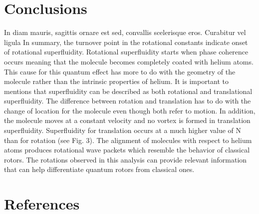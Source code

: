 \documentclass[a0b,landscape]{a0poster}
\begin{document}
\begin{multicols}{3}
\section*{Conclusions}
In diam mauris, sagittis ornare est sed, convallis scelerisque eros. Curabitur vel ligula In summary, the turnover point in the rotational constants indicate onset of rotational superfluidity.  Rotational superfluidity starts when phase coherence occurs meaning that the molecule becomes completely coated with helium atoms. This cause for this quantum effect has more to do with the geometry of the molecule rather than the intrinsic properties of helium.  It is important to mentions that superfluidity can be described as both rotational and translational superfluidity.  The difference between rotation and translation has to do with the change of location for the molecule even though both refer to motion.  In addition, the molecule moves at a constant velocity and no vortex is formed in translation superfluidity.  Superfluidity for translation occurs at a much higher value of N than for rotation (see Fig. 3).  The alignment of molecules with respect to helium atoms produces rotational wave packets which resemble the behavior of classical rotors.  The rotations observed in this analysis can provide relevant information that can help differentiate quantum rotors from classical ones.



\section*{References}
\end{multicols}
\end{document}
